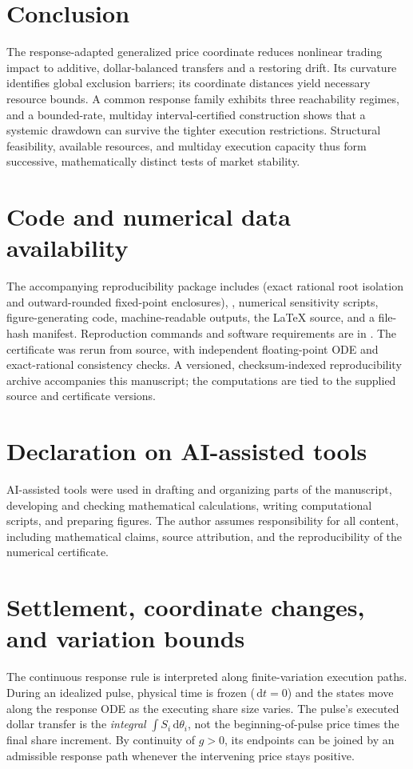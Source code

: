 \documentclass[11pt]{article}
\numberwithin{equation}{section}
\theoremstyle{definition}
\theoremstyle{remark}
\newcommand{\dd}{\,\mathrm{d}}
\begin{document}
\section{Conclusion}\label{sec:conclusion}
The response-adapted generalized price coordinate reduces nonlinear trading impact to additive, dollar-balanced transfers and a restoring drift. Its curvature identifies global exclusion barriers; its coordinate distances yield necessary resource bounds. A common response family exhibits three reachability regimes, and a bounded-rate, multiday interval-certified construction shows that a systemic drawdown can survive the tighter execution restrictions. Structural feasibility, available resources, and multiday execution capacity thus form successive, mathematically distinct tests of market stability.

\section*{Code and numerical data availability}
The accompanying reproducibility package includes  (exact rational root isolation and outward-rounded fixed-point enclosures), , numerical sensitivity scripts, figure-generating code, machine-readable outputs, the LaTeX source, and a file-hash manifest. Reproduction commands and software requirements are in . The certificate was rerun from source, with independent floating-point ODE and exact-rational consistency checks. A versioned, checksum-indexed reproducibility archive accompanies this manuscript; the computations are tied to the supplied source and certificate versions.

\section*{Declaration on AI-assisted tools}
AI-assisted tools were used in drafting and organizing parts of the manuscript, developing and checking mathematical calculations, writing computational scripts, and preparing figures. The author assumes responsibility for all content, including mathematical claims, source attribution, and the reproducibility of the numerical certificate.

\appendix
\section{Settlement, coordinate changes, and variation bounds}\label{app:accounting}
The continuous response rule is interpreted along finite-variation execution paths. During an idealized pulse, physical time is frozen ($\dd t=0$) and the states move along the response ODE as the executing share size varies. The pulse's executed dollar transfer is the \emph{integral} $\int S_i\dd\theta_i$, not the beginning-of-pulse price times the final share increment. By continuity of $g>0$, its endpoints can be joined by an admissible response path whenever the intervening price stays positive.
\end{document}
